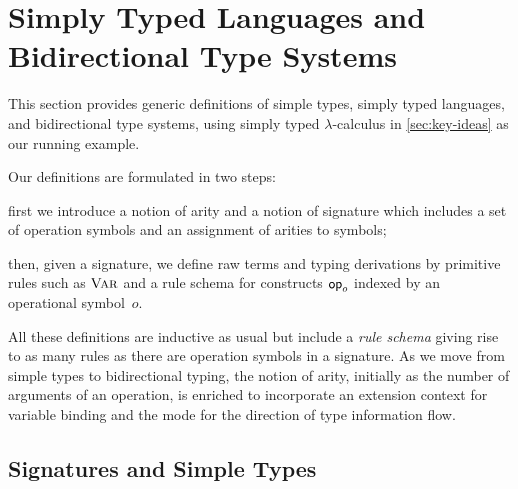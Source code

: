 
\section{Simply Typed Languages and Bidirectional Type Systems}\label{sec:defs}
This section provides generic definitions
of simple types, simply typed languages, and bidirectional type systems, using simply typed $\lambda$-calculus in \cref{sec:key-ideas} as our running example.

Our definitions are formulated in two steps:
\begin{enumerate*}
  \item first we introduce a notion of arity and a notion of signature which includes a set of operation symbols and an assignment of arities to symbols;
\item then, given a signature, we define raw terms and typing derivations by primitive rules such as $\textnormal{\textsc{Var}}$ and a rule schema for constructs $\mathsf{op}_o$ indexed by an operational symbol~$o$.
\end{enumerate*}
All these definitions are inductive as usual but include a \emph{rule schema} giving rise to as many rules as there are operation symbols in a signature.
As we move from simple types to bidirectional typing, the notion of arity, initially as the number of arguments of an operation, is enriched to incorporate an extension context for variable binding and the mode for the direction of type information flow.

\subsection{Signatures and Simple Types} \label{subsec:simple-types}

